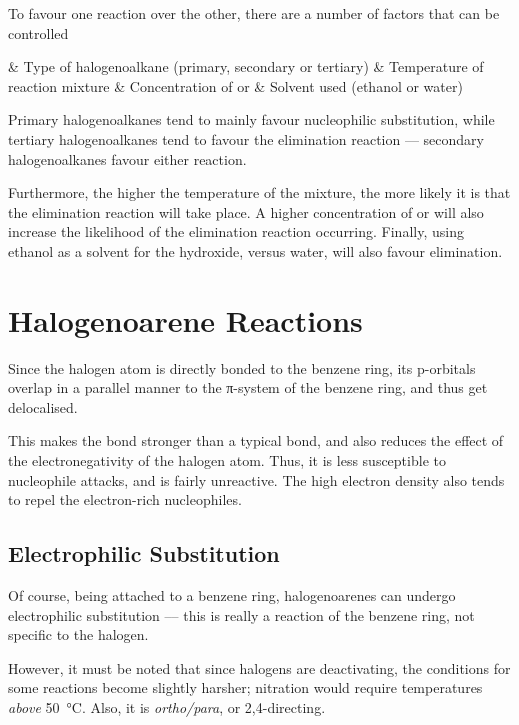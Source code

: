 			To favour one reaction over the other, there are a number of factors that can be controlled

			\begin{bulletlist}
				& Type of halogenoalkane (primary, secondary or tertiary)
				& Temperature of reaction mixture
				& Concentration of  or 
				& Solvent used (ethanol or water)
			\end{bulletlist}

			Primary halogenoalkanes tend to mainly favour nucleophilic substitution, while tertiary halogenoalkanes tend to favour the
			elimination reaction –– secondary halogenoalkanes favour either reaction.

			Furthermore, the higher the temperature of the mixture, the more likely it is that the elimination reaction will take place.
			A higher concentration of  or  will also increase the likelihood of the elimination reaction occurring.
			Finally, using ethanol as a solvent for the hydroxide, versus water, will also favour elimination.



	\pagebreak
	\section{Halogenoarene Reactions}

		Since the halogen atom is directly bonded to the benzene ring, its p-orbitals overlap in a parallel manner to the π-system of the
		benzene ring, and thus get delocalised.


		This makes the bond stronger than a typical  bond, and also reduces the effect of the electronegativity of the halogen atom.
		Thus, it is less susceptible to nucleophile attacks, and is fairly unreactive. The high electron density also tends to repel the
		electron-rich nucleophiles.


		\subsection{Electrophilic Substitution}

			Of course, being attached to a benzene ring, halogenoarenes can undergo electrophilic substitution –– this is really a reaction
			of the benzene ring, not specific to the halogen.

			However, it must be noted that since halogens are deactivating, the conditions for some reactions become slightly harsher;
			nitration would require temperatures \textit{above} \SI{50}{\celsius}. Also, it is \textit{ortho/para}, or 2,4-directing.

